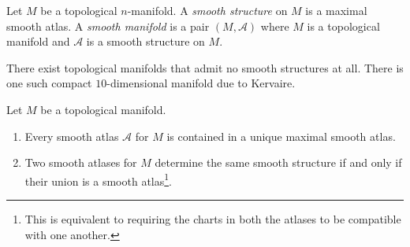 \begin{definition}
    Let $M$ be a topological $n$-manifold. A \emph{smooth structure} on $M$ is a maximal smooth atlas. A \emph{smooth manifold} is a pair $(M,\mathscr A)$ where $M$ is a topological manifold and $\mathscr A$ is a smooth structure on $M$.
\end{definition}

\begin{remark}
    There exist topological manifolds that admit no smooth structures at all. There is one such compact $10$-dimensional manifold due to Kervaire.
\end{remark}

\begin{proposition}
    Let $M$ be a topological manifold. 
    \begin{enumerate}[label=(\alph*)]
        \item Every smooth atlas $\mathscr A$ for $M$ is contained in a unique maximal smooth atlas. 
        \item Two smooth atlases for $M$ determine the same smooth structure if and only if their union is a smooth atlas\footnote{This is equivalent to requiring the charts in both the atlases to be compatible with one another.}.
    \end{enumerate}
\end{proposition}
